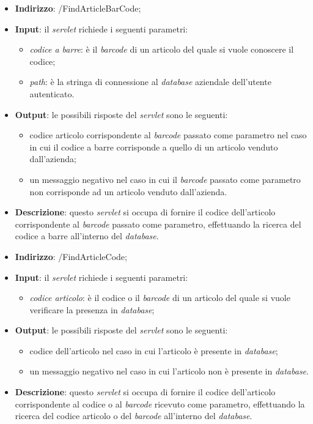 \begin{itemize}
	\item \textbf{Indirizzo}: /FindArticleBarCode;
	\item \textbf{Input}: il \textit{servlet} richiede i seguenti parametri:
		\begin{itemize}
			\item \textit{codice a barre}: è il \textit{barcode} di un articolo del quale si vuole conoscere il codice;
			\item \textit{path}: è la stringa di connessione al \textit{database} aziendale dell'utente autenticato.
		\end{itemize}
	\item \textbf{Output}: le possibili risposte del \textit{servlet} sono le seguenti:
		\begin{itemize}
			\item codice articolo corrispondente al \textit{barcode} passato come parametro nel caso in cui il codice a barre corrisponde a quello di un articolo venduto dall'azienda;
			\item un messaggio negativo nel caso in cui il \textit{barcode} passato come parametro non corrisponde ad un articolo venduto dall'azienda.
		\end{itemize}
	\item \textbf{Descrizione}: questo \textit{servlet} si occupa di fornire il codice dell'articolo corrispondente al \textit{barcode} passato come parametro, effettuando la ricerca del codice a barre all'interno del \textit{database}.
\end{itemize}


\begin{itemize}
	\item \textbf{Indirizzo}: /FindArticleCode;
	\item \textbf{Input}: il \textit{servlet} richiede i seguenti parametri:
		\begin{itemize}
			\item \textit{codice articolo}: è il codice o il \textit{barcode} di un articolo del quale si vuole verificare la presenza in \textit{database};
		\end{itemize}
	\item \textbf{Output}: le possibili risposte del \textit{servlet} sono le seguenti:
		\begin{itemize}
			\item codice dell'articolo nel caso in cui l'articolo è presente in \textit{database};
			\item un messaggio negativo nel caso in cui l'articolo non è presente in \textit{database}.
		\end{itemize}
	\item \textbf{Descrizione}: questo \textit{servlet} si occupa di fornire il codice dell'articolo corrispondente al codice o al \textit{barcode} ricevuto come parametro, effettuando la ricerca del codice articolo o del \textit{barcode} all'interno del \textit{database}.
\end{itemize}


